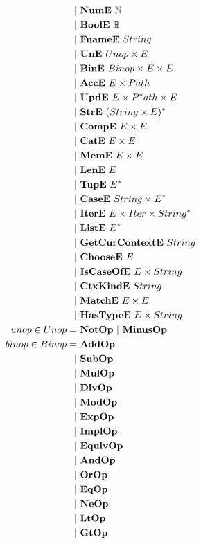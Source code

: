 \begin{align*}
    | & ~ \nume ~ \mathbb N \\
    | & ~ \boole ~ \mathbb B \\
    | & ~ \fnamee ~ String \\
    | & ~ \une ~ Unop \times E \\
    | & ~ \bine ~ Binop \times E \times E \\
    | & ~ \acce ~ E \times Path \\
    | & ~ \upde ~ E \times \seq Path \times E \\
    | & ~ \stre ~ \seq{(String \times E)} \\
    | & ~ \compe ~ E \times E \\
    | & ~ \cate ~ E \times E \\
    | & ~ \meme ~ E \times E \\
    | & ~ \lene ~ E \\
    | & ~ \tupe ~ \seq E \\
    | & ~ \casee ~ String \times \seq E \\
    | & ~ \itere ~ E \times Iter \times \seq{String} \\
    | & ~ \liste ~ \seq E \\
    | & ~ \getcurctxe ~ String \\
    | & ~ \choosee ~ E \\
    | & ~ \iscaseofe ~ E \times String \\
    | & ~ \ctxkinde ~ String \\
    | & ~ \matche ~ E \times E \\
    | & ~ \hastypee ~ E \times String \\
%
  unop \in Unop =& ~ \notop ~ | ~ \minusop \\
  binop \in Binop =& ~ \addop \\
    | & ~ \subop \\
    | & ~ \mulop \\
    | & ~ \divop \\
    | & ~ \modop \\
    | & ~ \expop \\
    | & ~ \implop \\
    | & ~ \equivop \\
    | & ~ \andop \\
    | & ~ \orop \\
    | & ~ \eqop \\
    | & ~ \neop \\
    | & ~ \ltop \\
    | & ~ \gtop \\

\end{align*}
